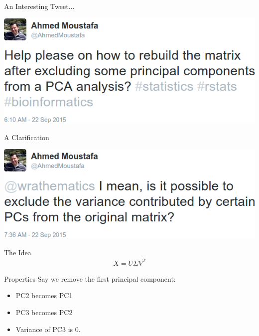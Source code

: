 \begin{frame}
  \begin{block}{An Interesting Tweet...}
    \begin{center}
      \includegraphics[width=.95\textwidth]{../common/pics/decomprecomp/tweet1}
    \end{center}
  \end{block}
\end{frame}


\begin{frame}
  \begin{block}{A Clarification}
    \begin{center}
      \includegraphics[width=.95\textwidth]{../common/pics/decomprecomp/tweet2}
    \end{center}
  \end{block}
\end{frame}


\begin{frame}
  \begin{block}{The Idea}
    \begin{align*}
      X = U \Sigma V^T
    \end{align*}
  \end{block}
\end{frame}


\begin{frame}
  \begin{block}{Properties}
    Say we remove the first principal component:
    \begin{itemize}
      \item PC2 becomes PC1
      \item PC3 becomes PC2
      \item Variance of PC3 is 0.
    \end{itemize}
  \end{block}
\end{frame}


